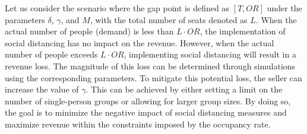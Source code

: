 Let us consider the scenario where the gap point is defined as $[T, OR]$ under the parameters $\delta$, $\gamma$, and $M$, with the total number of seats denoted as $L$. When the actual number of people (demand) is less than $L \cdot OR$, the implementation of social distancing has no impact on the revenue. However, when the actual number of people exceeds $L \cdot OR$, implementing social distancing will result in a revenue loss. The magnitude of this loss can be determined through simulations using the corresponding parameters. To mitigate this potential loss, the seller can increase the value of $\gamma$. This can be achieved by either setting a limit on the number of single-person groups or allowing for larger group sizes. By doing so, the goal is to minimize the negative impact of social distancing measures and maximize revenue within the constraints imposed by the occupancy rate.







